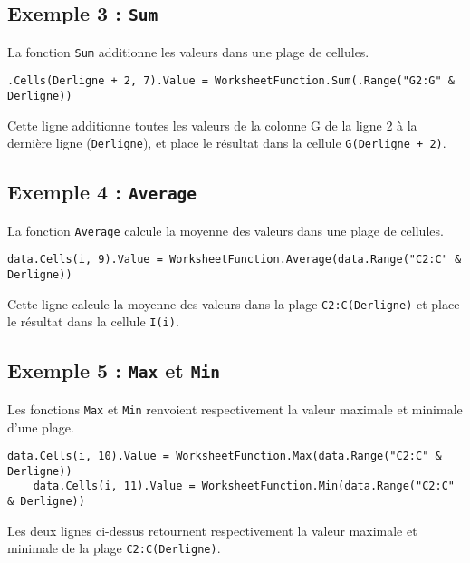 \documentclass[a4paper,12pt]{report}
\begin{document}
\subsection{Exemple 3 : \texttt{Sum}}
La fonction \texttt{Sum} additionne les valeurs dans une plage de cellules.

\begin{lstlisting}[language=VBScript]
	.Cells(Derligne + 2, 7).Value = WorksheetFunction.Sum(.Range("G2:G" & Derligne))
\end{lstlisting}

Cette ligne additionne toutes les valeurs de la colonne G de la ligne 2 à la dernière ligne (\texttt{Derligne}), et place le résultat dans la cellule \texttt{G(Derligne + 2)}.

\subsection{Exemple 4 : \texttt{Average}}
La fonction \texttt{Average} calcule la moyenne des valeurs dans une plage de cellules.

\begin{lstlisting}[language=VBScript]
	data.Cells(i, 9).Value = WorksheetFunction.Average(data.Range("C2:C" & Derligne))
\end{lstlisting}

Cette ligne calcule la moyenne des valeurs dans la plage \texttt{C2:C(Derligne)} et place le résultat dans la cellule \texttt{I(i)}.

\subsection{Exemple 5 : \texttt{Max} et \texttt{Min}}
Les fonctions \texttt{Max} et \texttt{Min} renvoient respectivement la valeur maximale et minimale d'une plage.

\begin{lstlisting}[language=VBScript]
	data.Cells(i, 10).Value = WorksheetFunction.Max(data.Range("C2:C" & Derligne))
	data.Cells(i, 11).Value = WorksheetFunction.Min(data.Range("C2:C" & Derligne))
\end{lstlisting}

Les deux lignes ci-dessus retournent respectivement la valeur maximale et minimale de la plage \texttt{C2:C(Derligne)}.

	
	
	
	
\end{document}
